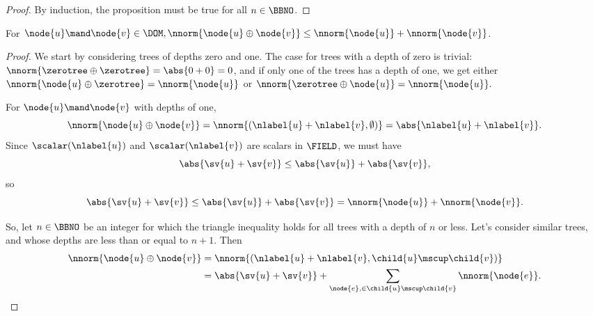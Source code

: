 \begin{definition}
\begin{proposition}
\begin{proof}
    By induction, the proposition must be true for all $n \in \BBNO$.
  \end{proof}
\end{proposition}

\begin{proposition}\label{triangle1}
  For $\node{u} \mand \node{v} \in \DOM, \nnorm{\node{u} \oplus \node{v}}
  \leq \nnorm{\node{u}} + \nnorm{\node{v}}$.

  \begin{proof}
    We start by considering trees of depths zero and one. The case for
    trees with a depth of zero is trivial: $\nnorm{\zerotree \oplus
      \zerotree} = \abs{0 + 0} = 0$, and if only one of the trees has a depth of one, we get either $\nnorm{\node{u} \oplus
      \zerotree} = \nnorm{\node{u}}$ or $\nnorm{\zerotree \oplus \node{u}} = \nnorm{\node{u}}.$

    For $\node{u} \mand \node{v}$  with depths of one, \[\nnorm{\node{u} \oplus \node{v}} = \nnorm{(\nlabel{u}+\nlabel{v}, \emptyset)}= \abs{\nlabel{u}+\nlabel{v}}.\]
    Since $\scalar(\nlabel{u})$ and $\scalar(\nlabel{v})$ are scalars in $\FIELD$, we must have
    \[\abs{\sv{u} + \sv{v}} \leq \abs{\sv{u}}+\abs{\sv{v}},\]
    so \[\abs{\sv{u}+\sv{v}} \leq \abs{\sv{u}}+\abs{\sv{v}} = \nnorm{\node{u}} + \nnorm{\node{v}}.\]

    So, let $n\in\BBNO$ be an integer for which the triangle inequality holds for all
    trees with a depth of $n$ or less.  Let's consider similar trees,  and  whose depths are less
    than or equal to $n+1$. Then
    \begin{align}
      \nnorm{\node{u} \oplus \node{v}} &= \nnorm{(\nlabel{u} + \nlabel{v}, \child{u}\mscup\child{v})} \\
      &= \abs{\sv{u} + \sv{v}} + \sum_{\node{e},\in{\child{u}\mscup\child{v}}}\nnorm{\node{e}}.
    \end{align}


\end{proof}
\end{proposition}
\end{definition}

